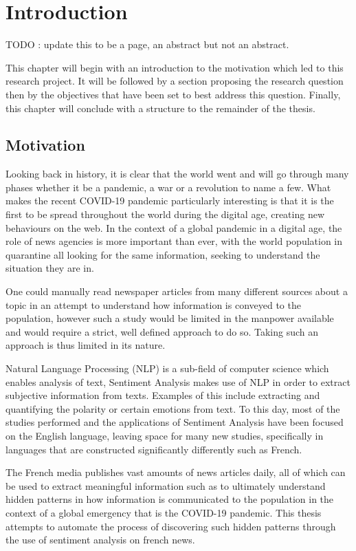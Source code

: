 \chapter{Introduction}\label{Introduction}
TODO : update this to be a page, an abstract but not an abstract.

This chapter will begin with an introduction to the motivation which led to this research project. It will be followed by a section proposing the research question then by the objectives that have been set to best address this question. Finally, this chapter will conclude with a structure to the remainder of the thesis.

\section{Motivation}\label{Motivation}
Looking back in history, it is clear that the world went and will go through many phases
whether it be a pandemic, a war or a revolution to name a few. What makes the recent COVID-19 pandemic particularly interesting is that it is the first to be spread throughout the world during the digital age, creating new behaviours on the web.   
In the context of a global pandemic in a digital age, the role of news agencies is more important than ever, with the world population in quarantine all looking for the same information, seeking to understand the situation they are in.

One could manually read newspaper articles from many different sources about a topic in an attempt to understand how information is conveyed to the population, however such a study would be limited in the manpower available and would require a strict, well defined approach to do so. Taking such an approach is thus limited in its nature.

Natural Language Processing (NLP) is a sub-field of computer science which enables analysis of text, Sentiment Analysis makes use of NLP in order to extract subjective information from texts. Examples of this include extracting and quantifying the polarity or certain emotions from text.
To this day, most of the studies performed and the applications of Sentiment Analysis have been focused on the English language, leaving space for many new studies, specifically in languages that are constructed significantly differently such as French.

The French media publishes vast amounts of news articles daily, all of which can be used to extract meaningful information such as to ultimately understand hidden patterns in how information is communicated to the population in the context of a global emergency that is the COVID-19 pandemic.
This thesis attempts to automate the process of discovering such hidden patterns through the use of sentiment analysis on french news.

